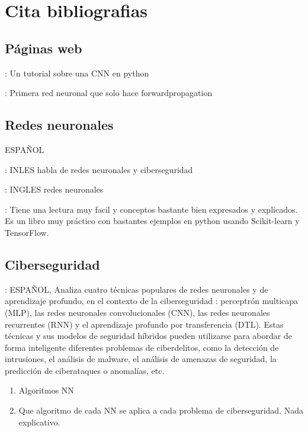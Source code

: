 \documentclass[11pt, a4paper]{article} %
\begin{document}
\section{Cita bibliografias}
\subsection{Páginas web}


\citep{kaggle_cnn_tutorial} : Un tutorial sobre una CNN en python

\citep{conceptos_RN_DesdeCero} : Primera red neuronal que solo hace forwardpropagation


\subsection{Redes neuronales}
\citep{matich2001redes} ESPAÑOL 

\citep{stamp2022artificial} : INLES habla de redes neuronales y ciberseguridad

\citep{tang2007neural} : INGLES redes neuronales



\citep{mirjalili2020python} : Tiene una lectura muy facil y conceptos bastante bien expresados y explicados. Es un libro muy práctico con bastantes ejemplos en python usando Scikit-learn y TensorFlow.





\subsection{Ciberseguridad}

\cite{yagual2022revision} : ESPAÑOL, Analiza cuatro técnicas populares de redes neuronales y de aprendizaje profundo, en el contexto de la ciberseguridad : perceptrón multicapa (MLP), las redes neuronales convolucionales (CNN), las redes neuronales recurrentes (RNN) y el aprendizaje profundo por transferencia (DTL). Estas técnicas y sus modelos de seguridad híbridos pueden utilizarse para abordar de forma inteligente diferentes problemas de ciberdelitos, como la detección de intrusiones, el análisis de malware, el análisis de amenazas de seguridad, la predicción de ciberataques o anomalías, etc. 
\begin{enumerate}
\item Algoritmos NN
\item Que algoritmo de cada NN se aplica a cada problema de ciberseguridad. Nada explicativo.
\end{enumerate}
\end{document}
